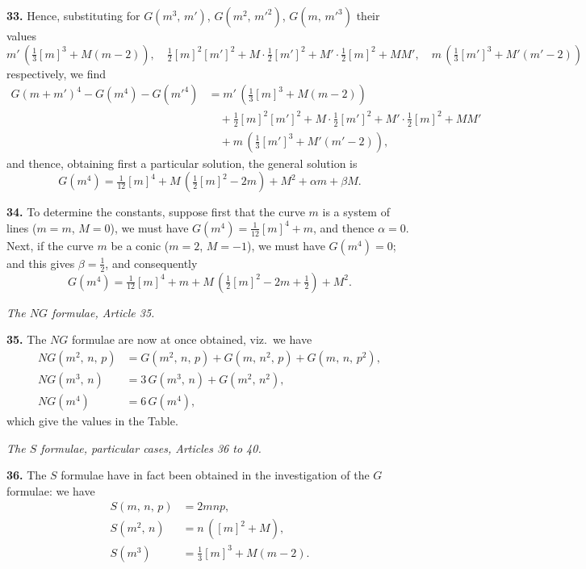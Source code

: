 \documentclass[11pt,a4paper]{article}
\begin{document}
\medskip

\textbf{33.} Hence, substituting for $G(m^3,\,m')$, $G(m^2,\,m'^2)$, $G(m,\,m'^3)$ their values
\[
m'\,(\tfrac{1}{3}[m]^3 + M(m-2)),\quad \tfrac{1}{2}[m]^2 [m']^2 + M \cdot \tfrac{1}{2}[m']^2 + M' \cdot \tfrac{1}{2}[m]^2 + MM',\quad m\,(\tfrac{1}{3}[m']^3 + M'(m'-2))
\]
respectively, we find
\begin{align*}
G(m+m')^4 - G(m^4) - G(m'^4) &= m'\,(\tfrac{1}{3}[m]^3 + M(m-2))\\
&\quad + \tfrac{1}{2}[m]^2 [m']^2 + M \cdot \tfrac{1}{2}[m']^2 + M' \cdot \tfrac{1}{2}[m]^2 + MM'\\
&\quad + m\,(\tfrac{1}{3}[m']^3 + M'(m'-2)),
\end{align*}
and thence, obtaining first a particular solution, the general solution is
\[
G(m^4) = \tfrac{1}{12}[m]^4 + M\,(\tfrac{1}{2}[m]^2 - 2m) + M^2 + \alpha m + \beta M.
\]

\medskip

\textbf{34.} To determine the constants, suppose first that the curve $m$ is a system of lines ($m=m$, $M=0$), we must have $G(m^4) = \tfrac{1}{12}[m]^4 + m$, and thence $\alpha = 0$. Next, if the curve $m$ be a conic ($m=2$, $M=-1$), we must have $G(m^4) = 0$; and this gives $\beta = \tfrac{1}{2}$, and consequently
\[
G(m^4) = \tfrac{1}{12}[m]^4 + m + M\,(\tfrac{1}{2}[m]^2 - 2m + \tfrac{1}{2}) + M^2.
\]

\bigskip

\begin{center}
\textit{The $NG$ formulae, Article 35.}
\end{center}

\textbf{35.} The $NG$ formulae are now at once obtained, viz.\ we have
\begin{align*}
NG(m^2,\,n,\,p) &= G(m^2,\,n,\,p) + G(m,\,n^2,\,p) + G(m,\,n,\,p^2),\\
NG(m^3,\,n) &= 3\,G(m^3,\,n) + G(m^2,\,n^2),\\
NG(m^4) &= 6\,G(m^4),
\end{align*}
which give the values in the Table.

\bigskip

\begin{center}
\textit{The $S$ formulae, particular cases, Articles 36 to 40.}
\end{center}

\textbf{36.} The $S$ formulae have in fact been obtained in the investigation of the $G$ formulae: we have
\begin{align*}
S(m,\,n,\,p) &= 2mnp,\\
S(m^2,\,n) &= n\,([m]^2 + M),\\
S(m^3) &= \tfrac{1}{3}[m]^3 + M(m-2).
\end{align*}
\end{document}
